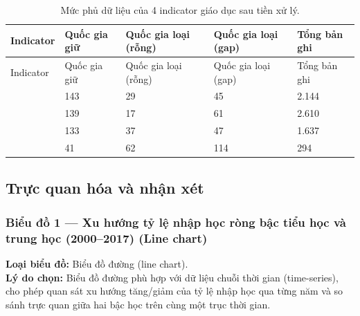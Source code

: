 \begin{longtable}{L{3.8cm}L{2.5cm}L{2.5cm}L{2.5cm}L{2.5cm}}
\caption{Mức phủ dữ liệu của 4 indicator giáo dục sau tiền xử lý.}
\label{tab:edu-coverage}\\
\toprule
Indicator & Quốc gia giữ & Quốc gia loại (rỗng) & Quốc gia loại (gap) & Tổng bản ghi \\
\midrule
\endfirsthead
\toprule
Indicator & Quốc gia giữ & Quốc gia loại (rỗng) & Quốc gia loại (gap) & Tổng bản ghi \\
\midrule
\endhead
{} & 143 & 29 & 45 & 2.144 \\
 & 139 & 17 & 61 & 2.610 \\
 & 133 & 37 & 47 & 1.637 \\
 & 41 & 62 & 114 & 294 \\
\bottomrule
\end{longtable}

\subsection{Trực quan hóa và nhận xét}

\subsubsection{Biểu đồ 1 --- Xu hướng tỷ lệ nhập học ròng bậc tiểu học và trung học (2000--2017) (Line chart)}

\textbf{Loại biểu đồ:} Biểu đồ đường (line chart).\\
\textbf{Lý do chọn:} Biểu đồ đường phù hợp với dữ liệu chuỗi thời gian (time-series), cho phép quan sát xu hướng tăng/giảm của tỷ lệ nhập học qua từng năm và so sánh trực quan giữa hai bậc học trên cùng một trục thời gian.


